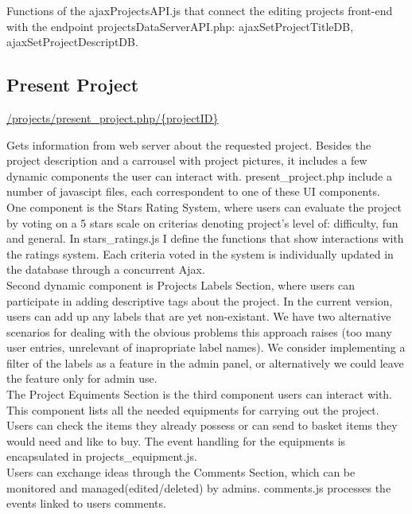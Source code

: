 Functions of the ajaxProjectsAPI.js that connect the editing projects front-end with the endpoint projectsDataServerAPI.php:  ajaxSetProjectTitleDB, ajaxSetProjectDescriptDB. 

 \subsection{Present Project}
\url{/projects/present\_project.php/{projectID}}	

Gets information from web server about the requested project.
Besides the project description and a carrousel with project pictures, it includes a few dynamic components the user can interact with. present\_project.php include a number of javascipt files, each correspondent to one of these UI components.\\

One component is the Stars Rating System, where users can evaluate the project by voting on a 5 stars scale on criterias denoting project's level of: difficulty, fun and general. In stars\_ratings.js I define the functions that show interactions with the ratings system. Each criteria voted in the system is individually updated in the database through a concurrent Ajax.\\

Second dynamic component is Projects Labels Section, where users can participate in adding descriptive tags about the project. In the current version, users can add up any labels that are yet non-existant. We have two alternative scenarios for dealing with the obvious problems this approach raises (too many user entries, unrelevant of inapropriate label names). We consider implementing a filter of the labels as a feature in the admin panel, or alternatively we could leave the feature only for admin use. \\

The Project Equiments Section is the third component users can interact with. This component lists all the needed equipments for carrying out the project. Users can check the items they already possess or can send to basket items they would need and like to buy. The event handling for the equipments is encapsulated in projects\_equipment.js. \\

Users can exchange ideas through the Comments Section, which can be monitored and managed(edited/deleted) by admins. comments.js processes the events linked to users comments.\\

